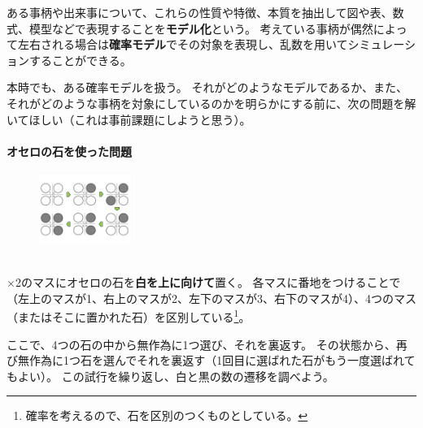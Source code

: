\documentclass[luatexja,fontsize=12pt]{jlreq}\usepackage{ifthen}\newcounter{enlarge}\setcounter{enlarge}{1}
\begin{document}
ある事柄や出来事について、これらの性質や特徴、本質を抽出して図や表、数式、模型などで表現することを\textbf{モデル化}という。
考えている事柄が偶然によって左右される場合は\textbf{確率モデル}でその対象を表現し、乱数を用いてシミュレーションすることができる。

本時でも、ある確率モデルを扱う。
それがどのようなモデルであるか、また、それがどのような事柄を対象にしているのかを明らかにする前に、次の問題を解いてほしい（これは事前課題にしようと思う）。
\mbox{}\\

\paragraph{オセロの石を使った問題}
\begin{figure}
\vspace*{-\intextsep}
\includegraphics[width=3cm]{f1.pdf}
\end{figure}%
\mbox{}\\
×2のマスにオセロの石を\textbf{白を上に向けて}置く。
各マスに番地をつけることで（左上のマスが1、右上のマスが2、左下のマスが3、右下のマスが4）、4つのマス（またはそこに置かれた石）を区別している\footnote{%
確率を考えるので、石を区別のつくものとしている。
}。

ここで、4つの石の中から無作為に1つ選び、それを裏返す。
その状態から、再び無作為に1つ石を選んでそれを裏返す（1回目に選ばれた石がもう一度選ばれてもよい）。
この試行を繰り返し、白と黒の数の遷移を調べよう。
\end{document}
